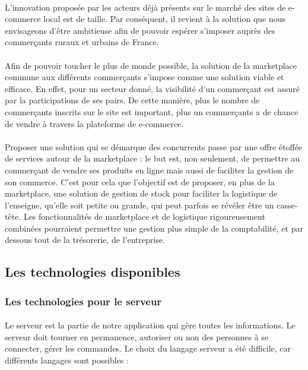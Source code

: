 \documentclass[a4paper, 12pt]{article}
\begin{document}
\paragraph{}L'innovation proposée par les acteurs déjà présents sur le marché des sites de e-commerce local est de taille. Par conséquent, il revient à la solution que nous envisageons d’être ambitieuse afin de pouvoir espérer s’imposer auprès des commerçants ruraux et urbains de France.
\paragraph{}Afin de pouvoir toucher le plus de monde possible, la solution de la marketplace commune aux différents commerçants s’impose comme une solution viable et efficace. En effet, pour un secteur donné, la visibilité d'un commerçant est assuré par la participations de ses pairs. De cette manière, plus le nombre de commerçants inscrits sur le site est important, plus un commerçants a de chance de vendre à travers la plateforme de e-commerce.
\paragraph{}Proposer une solution qui se démarque des concurrents passe par une offre étoffée de services autour de la marketplace : le but est, non seulement, de permettre au commerçant de vendre ses produits en ligne mais aussi de faciliter la gestion de son commerce. C’est pour cela que l’objectif est de proposer, en plus de la marketplace, une solution de gestion de stock pour faciliter la logistique de l’enseigne, qu’elle soit petite ou grande, qui peut parfois se révéler être un casse-tête. Les fonctionnalités de marketplace et de logistique rigoureusement combinées pourraient permettre une gestion plus simple de la comptabilité, et par dessous tout de la trésorerie, de l’entreprise.

\subsection{Les technologies disponibles}

\subsubsection{Les technologies pour le serveur}
\paragraph{}Le serveur est la partie de notre application qui gère toutes les informations. Le serveur doit tourner en permanence, autoriser ou non des personnes à se connecter, gérer les commandes. Le choix du langage serveur a été difficile, car différents langages sont possibles :
\end{document}
